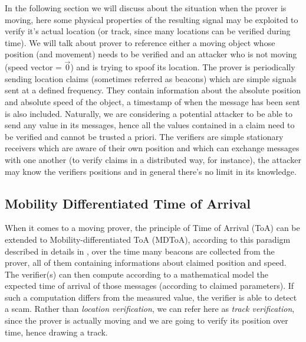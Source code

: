 \documentclass[conference]{IEEEtran}
\begin{document}


In the following section we will discuss about the situation when the prover is moving, here some physical properties of the resulting signal may be exploited to verify it's actual location (or track, since many locations can be verified during time). We will talk about prover to reference either a moving object whose position (and movement) needs to be verified and an attacker who is not moving (speed vector = \(\vec{0}\)) and is trying to spoof its location. The prover is periodically sending location claims (sometimes referred as beacons) which are simple signals sent at a defined frequency. They contain information about the absolute position and absolute speed of the object, a timestamp of when the message has been sent is also included. Naturally, we are considering a potential attacker to be able to send any value in its messages, hence all the values contained in a claim need to be verified and cannot be trusted a priori. The verifiers are simple stationary receivers which are aware of their own position and which can exchange messages with one another (to verify claims in a distributed way, for instance), the attacker may know the verifiers positions and in general there's no limit in its knowledge.

\subsection{Mobility Differentiated Time of Arrival}

When it comes to a moving prover, the principle of Time of Arrival (ToA) can be extended to Mobility-differentiated ToA (MDToA), according to this paradigm described in details in \cite{schaefer15}, over the time many beacons are collected from the prover, all of them containing informations about claimed position and speed. The verifier(s) can then compute according to a mathematical model the expected time of arrival of those messages (according to claimed parameters). If such a computation differs from the measured value, the verifier is able to detect a scam. Rather than \textit{location verification}, we can refer here as \textit{track verification}, since the prover is actually moving and we are going to verify its position over time, hence drawing a track.
\end{document}

